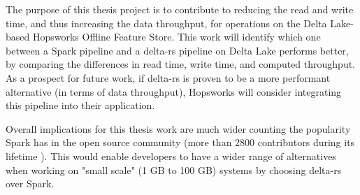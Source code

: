 The purpose of this thesis project is to contribute to reducing the read and write time, and thus increasing the data throughput, for operations on the Delta Lake-based  Hopsworks Offline Feature Store. This work will identify which one between a Spark pipeline and a delta-rs pipeline on Delta Lake performs better, by comparing the differences in read time, write time, and computed throughput. As a prospect for future work, if delta-rs is proven to be a more performant alternative (in terms of data throughput), Hopsworks will consider integrating this pipeline into their application.

Overall implications for this thesis work are much wider counting the popularity Spark has in the open source community (more than 2800 contributors during its lifetime \cite{ApacheSparkOpen}). This would enable developers to have a wider range of alternatives when working on "small scale" (1 GB to 100 GB) systems by choosing delta-rs over Spark.
